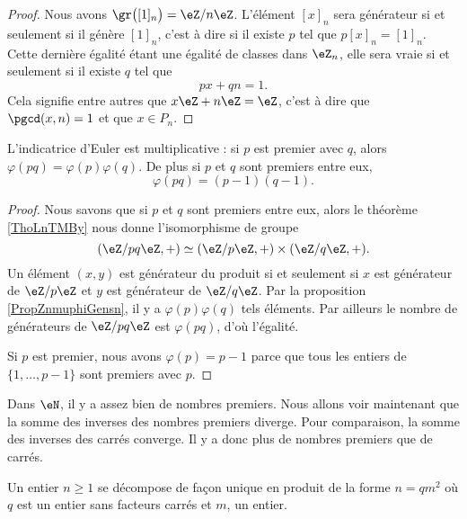 \begin{proof}
    Nous avons \( \gr\big( [1]_n \big)=\eZ/n\eZ\). L'élément \( [x]_n\) sera générateur si et seulement si il génère \( [1]_n \), c'est à dire si il existe \( p\) tel que \( p[x]_n=[1]_n\). Cette dernière égalité étant une égalité de classes dans \( \eZ_n\), elle sera vraie si et seulement si il existe \( q\) tel que
    \begin{equation}
        px+qn=1.
    \end{equation}
    Cela signifie entre autres que \( x\eZ+n\eZ=\eZ\), c'est à dire que \( \pgcd(x,n)=1\) et que \( x\in P_n\).
\end{proof}

\begin{corollary}       \label{CorlvTmsf}
    L'indicatrice d'Euler est multiplicative : si \( p\) est premier avec \( q\), alors \( \varphi(pq)=\varphi(p)\varphi(q)\). De plus si \( p\) et \( q\) sont premiers entre eux,
    \begin{equation}
        \varphi(pq)=(p-1)(q-1).
    \end{equation}
\end{corollary}

\begin{proof}
    Nous savons que si \( p\) et \( q\) sont premiers entre eux, alors le théorème \ref{ThoLnTMBy} nous donne l'isomorphisme de groupe
    \begin{equation}
        (\eZ/pq\eZ,+)\simeq(\eZ/p\eZ,+)\times(\eZ/q\eZ,+).
    \end{equation}
    Un élément \( (x,y)\) est générateur du produit si et seulement si \( x\) est générateur de \( \eZ/p\eZ\) et \( y\) est générateur de \( \eZ/q\eZ\). Par la proposition \ref{PropZnmuphiGensn}, il y a \( \varphi(p)\varphi(q)\) tels éléments. Par ailleurs le nombre de générateurs de \( \eZ/pq\eZ\) est \( \varphi(pq)\), d'où l'égalité.

    Si \( p\) est premier, nous avons \( \varphi(p)=p-1\) parce que tous les entiers de \( \{ 1,\ldots, p-1 \}\) sont premiers avec \( p\).
\end{proof}

Dans \( \eN\), il y a assez bien de nombres premiers. Nous allons voir maintenant que la somme des inverses des nombres premiers diverge. Pour comparaison, la somme des inverses des carrés converge. Il y a donc plus de nombres premiers que de carrés.
\begin{lemma}   \label{LemheKdsa}
    Un entier \( n\geq 1\) se décompose de façon unique en produit de la forme \( n=qm^2\) où \( q\) est un entier sans facteurs carrés et \( m\), un entier.
\end{lemma}

